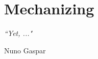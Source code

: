 
\chapter{Mechanizing} 
\label{chap:behaviour} 

\epigraph{\textit{“Yet, ..."}}{Nuno Gaspar}



\minitoc









